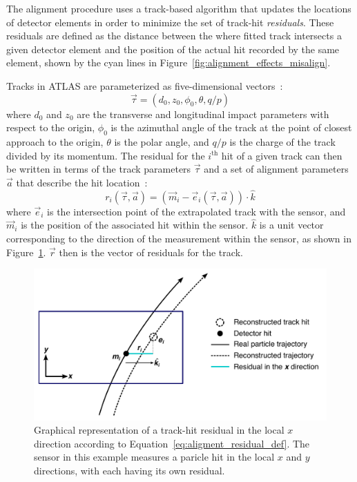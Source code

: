 The alignment procedure uses a track-based algorithm that updates the locations of detector elements in order to minimize the set of track-hit \emph{residuals}.
These residuals are defined as the distance between the where fitted track intersects a given detector element and the position of the actual hit recorded by the same element, shown by the cyan lines in Figure~\ref{fig:alignment_effects_misalign}.

Tracks in ATLAS are parameterized as five-dimensional vectors~\cite{2006.atlas-tracking-model}:%
\begin{equation}
  \vec{\tau} = (d_0,z_0,\phi_0,\theta,q/p)
\end{equation}
where $d_0$ and $z_0$ are the transverse and longitudinal impact parameters with respect to the origin, $\phi_0$ is the azimuthal angle of the track at the point of closest approach to the origin, $\theta$ is the polar angle, and $q/p$ is the charge of the track divided by its momentum.
The residual for the $i^{\textrm{th}}$ hit of a given track can then be written in terms of the track parameters $\vec{\tau}$ and a set of alignment parameters $\vec{a}$ that describe the hit location~\cite{2005.global-chi2-alignment}:
\begin{equation}
  r_i(\vec{\tau},\vec{a}) = (\vec{m}_i - \vec{e}_i (\vec{\tau},\vec{a}))\cdot\hat{k}
  \label{eq:aligment_residual_def}
\end{equation}
where $\vec{e}_i$ is the intersection point of the extrapolated track with the sensor, and $\vec{m}_i$ is the position of the associated hit within the sensor.
$\hat{k}$ is a unit vector corresponding to the direction of the measurement within the sensor, as shown in Figure~\ref{fig:alignment_residual}.
$\vec{r}$ then is the vector of residuals for the track.

\begin{figure}[htbp]
  \centering
  \includegraphics[width=.74\textwidth]{figs/alignment/residual2}
  \caption{Graphical representation of a track-hit residual in the local $x$ direction according to Equation~\ref{eq:aligment_residual_def}.  The sensor in this example measures a paricle hit in the local $x$ and $y$ directions, with each having its own residual.}
  \label{fig:alignment_residual}
\end{figure}

